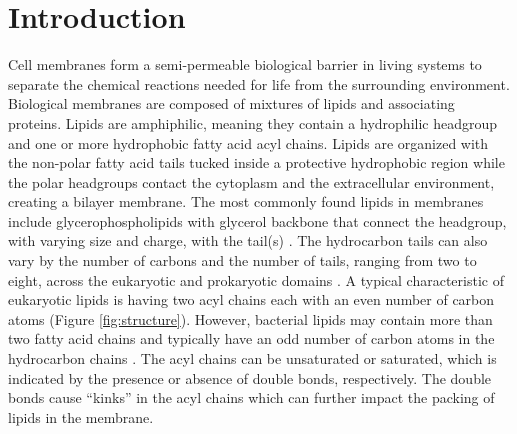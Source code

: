 \documentclass[10pt, letterpaper]{article}
\begin{document}
\newpage
\tableofcontents
\newpage

\cleardoublepage
{}
\listoffigures

\clearpage
{}
\pagestyle{myheadings}

\section{Introduction}

\fancyhf{}
\fancyhead[R]{\thepage}

Cell membranes form a semi-permeable biological barrier in living systems to separate the chemical reactions needed for life from the surrounding environment. Biological membranes are composed of mixtures of lipids and associating proteins. Lipids are amphiphilic, meaning they contain a hydrophilic headgroup and one or more hydrophobic fatty acid acyl chains. Lipids are organized with the non-polar fatty acid tails tucked inside a protective hydrophobic region while the polar headgroups contact the cytoplasm and the extracellular environment, creating a bilayer membrane.
The most commonly found lipids in membranes include glycerophospholipids with glycerol backbone that  connect the headgroup, with varying size and charge, with the tail(s) \cite{botan2015toward}. The hydrocarbon tails can also vary by the number of carbons and the number of tails, ranging from two to eight, across the eukaryotic and prokaryotic domains \cite{kim2016bilayer}. A typical characteristic of eukaryotic lipids is having two acyl chains each with an even number of carbon atoms (Figure \ref{fig:structure}). However, bacterial lipids may contain more than two fatty acid chains and typically have an odd number of carbon atoms in the hydrocarbon  chains \cite{kim2016bilayer}. The acyl chains can be unsaturated or saturated, which is indicated by the presence or absence of double bonds, respectively.
The double bonds cause \enquote{kinks} in the acyl chains which can further impact the packing of lipids in the membrane. 
\end{document}
